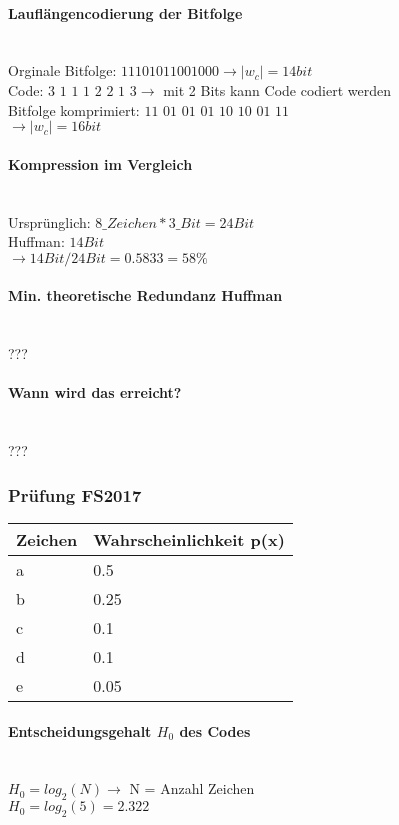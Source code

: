 \paragraph{Lauflängencodierung der Bitfolge}\mbox{}\\
Orginale Bitfolge: $11101011001000 \rightarrow |w_c| = 14 bit$\\
Code: $3$ $1$ $1$ $1$ $2$ $2$ $1$ $3 \rightarrow$ mit 2 Bits kann Code codiert werden\\
Bitfolge komprimiert: $11$ $01$ $01$ $01$ $10$ $10$ $01$ $11$\\
$\rightarrow |w_c| = 16 bit$

\paragraph{Kompression im Vergleich}\mbox{}\\
Ursprünglich: $8\_Zeichen * 3\_Bit = 24 Bit$\\
Huffman: $14 Bit$\\
$\rightarrow 14Bit/24Bit=0.5833=58\%$

\paragraph{Min. theoretische Redundanz Huffman}\mbox{}\\
???

\paragraph{Wann wird das erreicht?}\mbox{}\\
???

\subsubsection{Prüfung FS2017}
\begin{center}
    \centering
    \begin{tabular}{l | l}
        \bfseries{Zeichen} & \bfseries{Wahrscheinlichkeit p(x)}\\ \hline
        a & 0.5\\ 
        b & 0.25\\
        c & 0.1\\
        d & 0.1\\
        e & 0.05
    \end{tabular}
\end{center}

\paragraph{Entscheidungsgehalt $H_0$ des Codes}\mbox{}\\
$H_0=log_2(N) \rightarrow$ N = Anzahl Zeichen\\
$H_0=log_2(5)=2.322$

